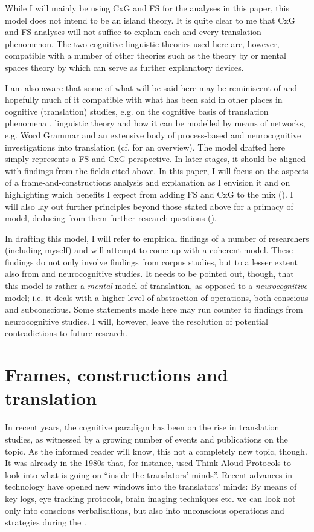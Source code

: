 \documentclass[output=paper]{LSP/langsci}
\begin{document}
\newpage 
While I will mainly be using CxG and FS for the analyses in this paper, this model does not intend to be an island theory. It is quite clear to me that CxG and FS analyses will not suffice to explain each and every translation phenomenon. The two cognitive linguistic theories used here are, however, compatible with a number of other theories such as the  theory by \citet{Lakoff1980, Lakoff1999} or mental spaces theory by \citet{Fauconnier2002} which can serve as further explanatory devices. 

I am also aware that some of what will be said here may be reminiscent of and hopefully much of it compatible with what has been said in other places in cognitive (translation) studies, e.g. on the cognitive basis of translation phenomena \citep{Halverson2003}, linguistic theory and how it can be modelled by means of networks, e.g. Word Grammar \citep{Hudson2007} and an extensive body of process-based and neurocognitive investigations into translation (cf. \citealt{Gopferich2008, Aitchison2012} for an overview). The model drafted here simply represents a FS and CxG perspective. In later stages, it should be aligned with findings from the fields cited above. In this paper, I will focus on the aspects of a frame-and-constructions analysis and explanation as I envision it and on highlighting which benefits I expect from adding FS and CxG to the mix (). I will also lay out further principles beyond those stated above for a primacy of  model, deducing from them further research questions ().

In drafting this model, I will refer to empirical findings of a number of researchers (including myself) and will attempt to come up with a coherent model. These findings do not only involve findings from corpus studies, but to a lesser extent also from  and neurocognitive studies. It needs to be pointed out, though, that this model is rather a \textit{mental} model of translation, as opposed to a \textit{neurocognitive} model; i.e. it deals with a higher level of abstraction of operations, both conscious and subconscious. Some statements made here may run counter to findings from neurocognitive studies. I will, however, leave the resolution of potential contradictions to future research.

\section{Frames, constructions and translation}\label{czulo:sec:2}
\largerpage
In recent years, the cognitive paradigm has been on the rise in translation studies, as witnessed by a growing number of events and publications on the topic. As the informed reader will know, this not a completely new topic, though. It was already in the 1980s that, for instance, \citet{Krings1986Was} used Think-Aloud-Protocols to look into what is going on ``inside the translators' minds''. Recent advances in technology have opened new windows into the translators' minds: By means of key logs, eye tracking protocols, brain imaging techniques etc. we can look not only into conscious verbalisations, but also into unconscious operations and strategies during the .
\end{document}
